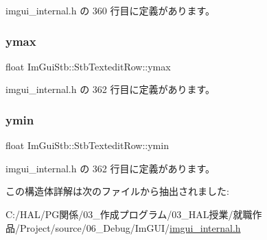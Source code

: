  imgui\+\_\+internal.\+h の 360 行目に定義があります。

\mbox{\label{struct_im_gui_stb_1_1_stb_textedit_row_a24b4b9e6983914519d01335b4014a774}} 
\subsubsection{\texorpdfstring{ymax}{ymax}}
{\footnotesize\ttfamily float Im\+Gui\+Stb\+::\+Stb\+Textedit\+Row\+::ymax}



 imgui\+\_\+internal.\+h の 362 行目に定義があります。

\mbox{\label{struct_im_gui_stb_1_1_stb_textedit_row_a0c8be0676857e3a182ab73d1782e5da0}} 
\subsubsection{\texorpdfstring{ymin}{ymin}}
{\footnotesize\ttfamily float Im\+Gui\+Stb\+::\+Stb\+Textedit\+Row\+::ymin}



 imgui\+\_\+internal.\+h の 362 行目に定義があります。



この構造体詳解は次のファイルから抽出されました\+:\begin{DoxyCompactItemize}
\item 
C\+:/\+H\+A\+L/\+P\+G関係/03\+\_\+作成プログラム/03\+\_\+\+H\+A\+L授業/就職作品/\+Project/source/06\+\_\+\+Debug/\+Im\+G\+U\+I/\mbox{\hyperlink{imgui__internal_8h}{imgui\+\_\+internal.\+h}}\end{DoxyCompactItemize}
